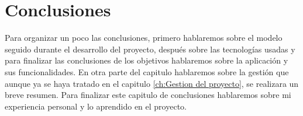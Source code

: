 \chapter{Conclusiones}
\label{ch:Conclusiones}
Para organizar un poco las conclusiones, primero hablaremos sobre el modelo seguido durante el desarrollo del proyecto, después sobre las tecnologías usadas y para finalizar las conclusiones de los objetivos hablaremos sobre la aplicación y sus funcionalidades. En otra parte del capitulo hablaremos sobre la gestión que aunque ya se haya tratado en el capitulo \ref{ch:Gestion del proyecto}, se realizara un breve resumen. Para finalizar este capitulo de conclusiones hablaremos sobre mi experiencia personal y lo aprendido en el proyecto.
\newpage

\newpage

\newpage





























